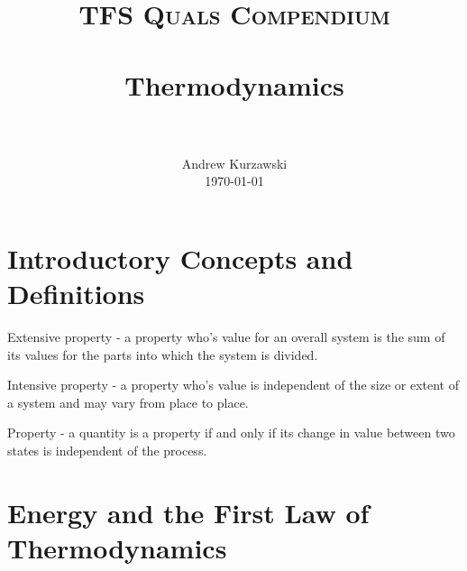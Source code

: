 \documentclass[paper=letter, fontsize=11pt]{scrartcl}
\title{
        \usefont{OT1}{bch}{b}{n}
        \normalfont \normalsize \textsc{TFS Quals Compendium} \\ [25pt]
        \horrule{0.5pt} \\[0.4cm]
        \huge Thermodynamics \\
        \horrule{2pt} \\[0.5cm]
}
\author{
        \normalfont                                 \normalsize
        Andrew Kurzawski\\[-3pt]      \normalsize
        \today
}
\date{}
\numberwithin{equation}{section}        %
\numberwithin{figure}{section}          %
\numberwithin{table}{section}               %
\begin{document}
\maketitle

\section{Introductory Concepts and Definitions}
    
    Extensive property - a property who's value for an overall system is the sum of its values for the parts into which the system is divided.

    Intensive property - a property who's value is independent of the size or extent of a system and may vary from place to place.

    Property - a quantity is a property if and only if its change in value between two states is independent of the process.


\section{Energy and the First Law of Thermodynamics}


\end{document}
